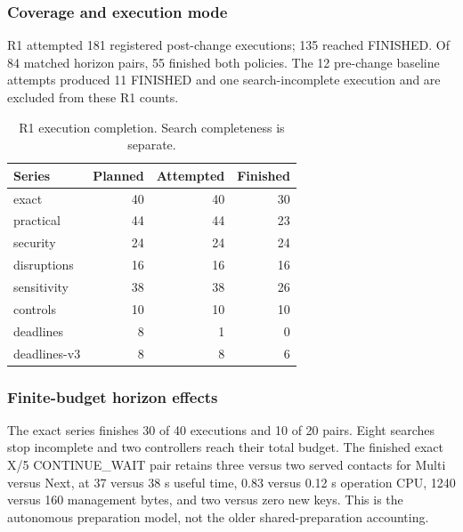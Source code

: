 \subsubsection{Coverage and execution mode}

R1 attempted 181 registered post-change executions; 135 reached FINISHED. Of 84 matched horizon pairs, 55 finished both policies. The 12 pre-change baseline attempts produced 11 FINISHED and one search-incomplete execution and are excluded from these R1 counts.

\begin{table}[t]\centering\caption{R1 execution completion. Search completeness is separate.}\label{tab:r1coverage}\begin{tabular}{lrrr}\toprule Series & Planned & Attempted & Finished\\\midrule

exact & 40 & 40 & 30\\

practical & 44 & 44 & 23\\

security & 24 & 24 & 24\\

disruptions & 16 & 16 & 16\\

sensitivity & 38 & 38 & 26\\

controls & 10 & 10 & 10\\

deadlines & 8 & 1 & 0\\

deadlines-v3 & 8 & 8 & 6\\

\bottomrule\end{tabular}\end{table}

\subsubsection{Finite-budget horizon effects}

The exact series finishes 30 of 40 executions and 10 of 20 pairs. Eight searches stop incomplete and two controllers reach their total budget. The finished exact X/5 CONTINUE\_WAIT pair retains three versus two served contacts for Multi versus Next, at 37 versus 38 s useful time, 0.83 versus 0.12 s operation CPU, 1240 versus 160 management bytes, and two versus zero new keys. This is the autonomous preparation model, not the older shared-preparation accounting.

